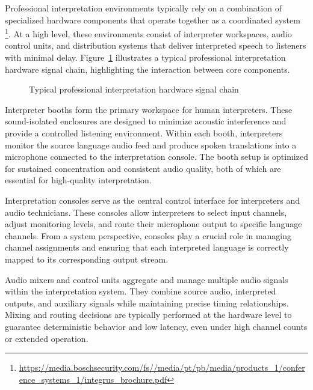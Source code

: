 
Professional interpretation environments typically rely on a combination of specialized hardware components that operate together as a coordinated system \footnote{\url{https://media.boschsecurity.com/fs//media/pt/pb/media/products_1/conference_systems_1/integrus_brochure.pdf}}. At a high level, these environments consist of interpreter workspaces, audio control units, and distribution systems that deliver interpreted speech to listeners with minimal delay. Figure~\ref{fig:signal_chain} illustrates a typical professional interpretation hardware signal chain, highlighting the interaction between core components.

\begin{figure}[!htbp]
  \centering
  
  \caption[Professional Interpretation Hardware Signal Chain]{Typical professional interpretation hardware signal chain}
  \label{fig:signal_chain}
\end{figure}

Interpreter booths form the primary workspace for human interpreters. These sound-isolated enclosures are designed to minimize acoustic interference and provide a controlled listening environment. Within each booth, interpreters monitor the source language audio feed and produce spoken translations into a microphone connected to the interpretation console. The booth setup is optimized for sustained concentration and consistent audio quality, both of which are essential for high-quality interpretation.

Interpretation consoles serve as the central control interface for interpreters and audio technicians. These consoles allow interpreters to select input channels, adjust monitoring levels, and route their microphone output to specific language channels. From a system perspective, consoles play a crucial role in managing channel assignments and ensuring that each interpreted language is correctly mapped to its corresponding output stream.

Audio mixers and control units aggregate and manage multiple audio signals within the interpretation system. They combine source audio, interpreted outputs, and auxiliary signals while maintaining precise timing relationships. Mixing and routing decisions are typically performed at the hardware level to guarantee deterministic behavior and low latency, even under high channel counts or extended operation.

